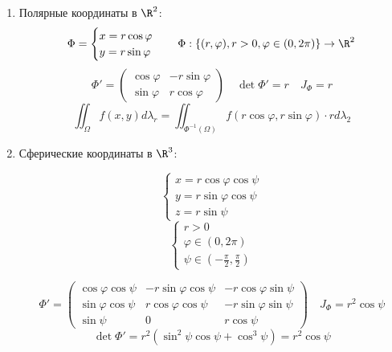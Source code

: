 \begin{example}\itemfix
    \begin{enumerate}
        \item Полярные координаты в \(\R^2\):
              \[\Phi = \begin{cases} x = r\cos \varphi \\ y = r\sin \varphi \end{cases} \quad \Phi : \{(r, \varphi), r > 0, \varphi\in(0, 2\pi)\} \to \R^2\]
              \[\Phi' = \begin{pmatrix} \cos \varphi & - r \sin \varphi \\ \sin \varphi & r \cos \varphi \end{pmatrix} \quad \det \Phi' = r \quad J_\Phi = r \]
              \[\iint_\Omega f(x, y)d\lambda_r = \iint_{\Phi^{ - 1}(\Omega)} f(r \cos \varphi, r \sin \varphi) \cdot r d \lambda_2\]
        \item Сферические координаты в \(\R^3\):

              \[\begin{cases}
                      x = r\cos \varphi\cos \psi \\
                      y = r\sin \varphi\cos \psi \\
                      z = r\sin \psi
                  \end{cases}\]
              \[\begin{cases}
                      r > 0                 \\
                      \varphi \in (0, 2\pi) \\
                      \psi\in \left( -\frac{\pi}{2}, \frac{\pi}{2} \right)
                  \end{cases}\]

              \[\Phi' = \begin{pmatrix}
                      \cos \varphi\cos \psi  & - r\sin \varphi \cos \psi & - r\cos \varphi \sin \psi \\
                      \sin \varphi \cos \psi & r\cos \varphi\cos \psi    & - r\sin \varphi\sin \psi  \\
                      \sin \psi              & 0                         & r\cos \psi
                  \end{pmatrix} \quad J_\Phi = r^2\cos \psi\]
              \[\det \Phi' = r^2(\sin^2\psi\cos \psi + \cos^3\psi) = r^2\cos \psi\]
    \end{enumerate}
\end{example}

